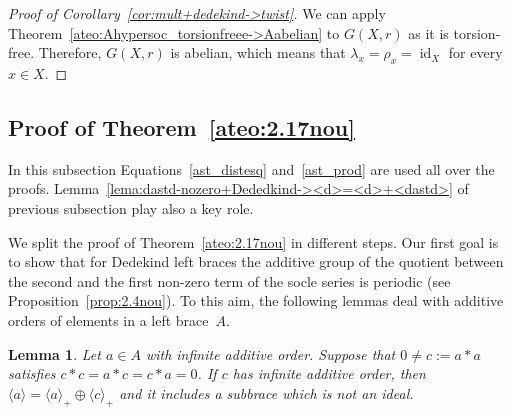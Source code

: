 \documentclass[12pt, a4paper, english]{article}
\newtheorem{lema}[teorema]{Lemma}
\theoremstyle{definition}
\DeclareMathOperator{\Soc}{Soc}
\DeclareMathOperator{\id}{id}
\begin{document}
\begin{proof}[Proof of Corollary~\ref{cor:mult+dedekind->twist}]
We can apply Theorem~\ref{ateo:Ahypersoc_torsionfreee->Aabelian} to $G(X,r)$ as it is torsion-free. Therefore, $G(X,r)$ is abelian, which means that $\lambda_x = \rho_x = \id_X$ for every $x\in X$.
\end{proof}


\subsection{Proof of Theorem~\ref{ateo:2.17nou}}

\label{subsec:proof3}

In this subsection Equations~\eqref{ast_distesq} and~\eqref{ast_prod} are used all over the proofs. Lemma~\ref{lema:dastd-nozero+Dededkind-><d>=<d>+<dastd>} of previous subsection play also a key role.

We split the proof of Theorem~\ref{ateo:2.17nou} in different steps. Our first goal is to show that for Dedekind left braces the additive group of the quotient 
between the second and the first non-zero term of the socle series is periodic (see Proposition~\ref{prop:2.4nou}). To this aim, the following lemmas deal with additive orders of elements in a left brace~$A$. 



\begin{lema}
\label{lema:infiniteorder->subbridanoideal}
Let $a\in A$ with infinite additive order. Suppose that $0 \neq c:= a \ast a$ satisfies $c \ast c = a \ast c = c \ast a = 0$. If $c$ has infinite additive order, then $\langle a \rangle = \langle a \rangle_+ \oplus \langle c \rangle_+$ and it includes a subbrace which is not an ideal.
\end{lema}
\end{document}
